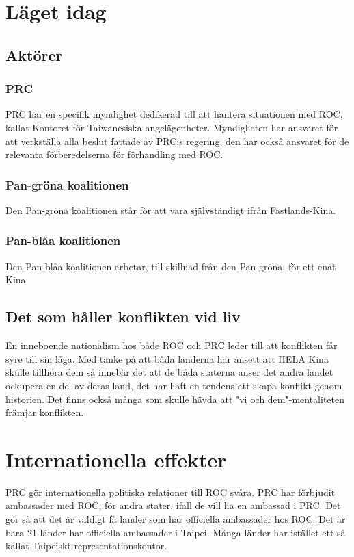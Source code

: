 \documentclass[a4paper,10pt]{article}
\begin{document}
\section*{Läget idag}


\subsection*{Aktörer}

\subsubsection*{PRC}
PRC har en specifik myndighet dedikerad till att hantera situationen med ROC, kallat Kontoret för Taiwanesiska angelägenheter. Myndigheten har ansvaret för att verkställa alla beslut fattade av PRC:s regering, den har också ansvaret för de relevanta förberedelserna för förhandling med ROC.

\subsubsection*{Pan-gröna koalitionen}
Den Pan-gröna koalitionen står för att vara självständigt ifrån Fastlands-Kina.

\subsubsection*{Pan-blåa koalitionen}
Den Pan-blåa koalitionen arbetar, till skillnad från den Pan-gröna, för ett enat Kina.

\subsection*{Det som håller konflikten vid liv}
En inneboende nationalism hos både ROC och PRC leder till att konflikten får syre till sin låga. Med tanke på att båda länderna har ansett att HELA Kina skulle tillhöra dem så innebär det att de båda staterna anser det andra landet ockupera en del av deras land, det har haft en tendens att skapa konflikt genom historien. Det finns också många som skulle hävda att "vi och dem"-mentaliteten främjar konflikten.

\section*{Internationella effekter}
PRC gör internationella politiska relationer till ROC svåra. PRC har förbjudit ambassader med ROC, för andra stater, ifall de vill ha en ambassad i PRC. Det gör så att det är väldigt få länder som har officiella ambassader hos ROC. Det är bara 21 länder har officiella ambassader i Taipei. Många länder har istället ett så kallat Taipeiskt representationskontor. 
\end{document}
